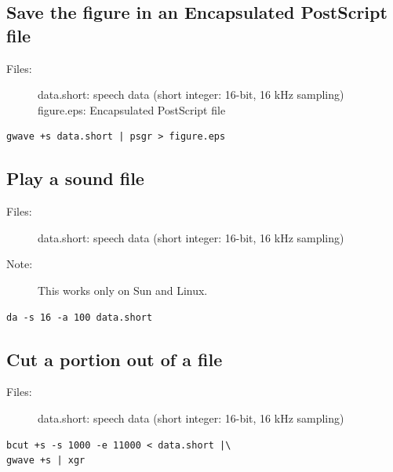\documentclass[a4paper]{article}
\begin{document}
\subsection{Save the figure in an Encapsulated PostScript file}

\begin{description}
\item[Files:]
  data.short: speech data (short integer: 16-bit, 16 kHz sampling)\\
  figure.eps: Encapsulated PostScript file
\end{description}

\begin{verbatim}
gwave +s data.short | psgr > figure.eps
\end{verbatim}

\subsection{Play a sound file}

\begin{description}
\item[Files:]
  data.short: speech data (short integer: 16-bit, 16 kHz sampling)
\item[Note:]
  This works only on Sun and Linux.
\end{description}

\begin{verbatim}
da -s 16 -a 100 data.short
\end{verbatim}

\subsection{Cut a portion out of a file}

\begin{description}
\item[Files:]
  data.short: speech data (short integer: 16-bit, 16 kHz sampling)
\end{description}

\begin{verbatim}
bcut +s -s 1000 -e 11000 < data.short |\
gwave +s | xgr
\end{verbatim}
\end{document}
